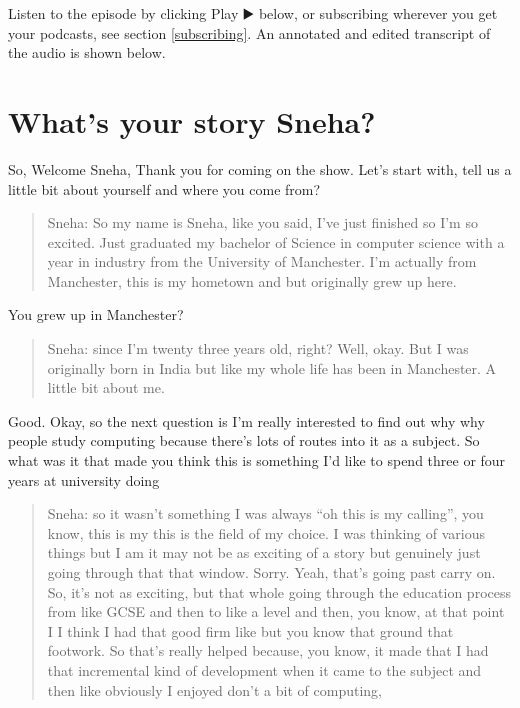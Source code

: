 \documentclass[
]{book}
\begin{document}
Listen to the episode by clicking Play ▶️ below, or subscribing wherever you get your podcasts, see section \ref{subscribing}. An annotated and edited transcript of the audio is shown below.

\hypertarget{sneha-story}{%
\section{What's your story Sneha?}\label{sneha-story}}

So, Welcome Sneha, Thank you for coming on the show. Let's start with, tell us a little bit about yourself and where you come from?

\begin{quote}
Sneha: So my name is Sneha, like you said, I've just finished so I'm so excited. Just graduated my bachelor of Science in computer science with a year in industry from the University of Manchester. I'm actually from Manchester, this is my hometown and but originally grew up here.
\end{quote}

You grew up in Manchester?

\begin{quote}
Sneha: since I'm twenty three years old, right? Well, okay. But I was originally born in India but like my whole life has been in Manchester. A little bit about me.
\end{quote}

Good. Okay, so the next question is I'm really interested to find out why why people study computing because there's lots of routes into it as a subject. So what was it that made you think this is something I'd like to spend three or four years at university doing

\begin{quote}
Sneha: so it wasn't something I was always ``oh this is my calling'', you know, this is my this is the field of my choice. I was thinking of various things but I am it may not be as exciting of a story but genuinely just going through that that window. Sorry. Yeah, that's going past carry on. So, it's not as exciting, but that whole going through the education process from like GCSE and then to like a level and then, you know, at that point I I think I had that good firm like but you know that ground that footwork. So that's really helped because, you know, it made that I had that incremental kind of development when it came to the subject and then like obviously I enjoyed don't a bit of computing,
\end{quote}
\end{document}
